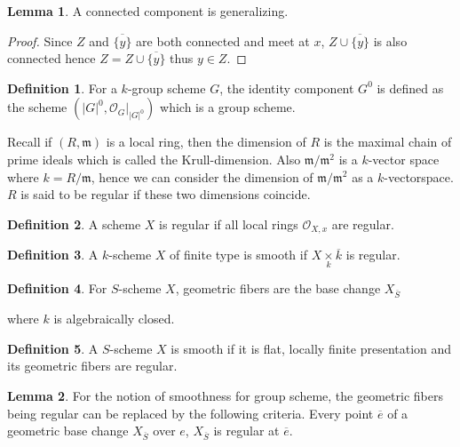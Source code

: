 \documentclass[10pt]{article}
\numberwithin{equation}{section}
\theoremstyle{definition}
\newtheorem{definition}{Definition}[section]
\newtheorem{lemma}{Lemma}[section]
\DeclareMathOperator{\Spec}{Spec}
\newcommand{\m}[0]{\mathfrak{m}}
\newcommand{\ab}[1]{\vert #1 \vert}
\newcommand{\cO}[0]{\mathcal{O}}
\newcommand{\fib}[1]{%
  \mathbin{\mathop{\times}\limits_{#1}}%
}
\begin{document}
\begin{lemma}
    \label{lemma_14}
    A connected component is generalizing.
\end{lemma}
\begin{proof}
    Since $Z$ and $\overline{\{y\}}$ are both connected and meet at $x$, $Z\cup\overline{\{y\}}$ is also connected hence $Z = Z\cup\overline{\{y\}}$ thus $y\in Z$.
\end{proof}
\begin{definition}
    \label{definition_15}
    For a $k$-group scheme $G$, the identity component $G^0$ is defined as the scheme $(\ab{G}^0,\cO_G|_{\ab{G}^0})$ which is a group scheme.
\end{definition}
Recall if $(R,\m)$ is a local ring, then the dimension of $R$ is the maximal chain of prime ideals which is called the Krull-dimension. Also $\m/\m^2$ is a $k$-vector space where $k=R/\m$, hence we can consider the dimension of $\m/\m^2$ as a $k$-vectorspace. $R$ is said to be regular if these two dimensions coincide.
\begin{definition}
    A scheme $X$ is regular if all local rings $\cO_{X,x}$ are regular.
\end{definition}
\begin{definition}
    A $k$-scheme $X$ of finite type is smooth if $X\fib{k}\overline{k}$ is regular.
\end{definition}
\begin{definition}
    For $S$-scheme $X$, geometric fibers are the base change $X_{\overline{S}}$
    \begin{center}
    \end{center}
    where $k$ is algebraically closed.
\end{definition}
\begin{definition}
    A $S$-scheme $X$ is smooth if it is flat, locally finite presentation and its geometric fibers are regular. 
\end{definition}
\begin{lemma}
    \label{lemma_16}
    For the notion of smoothness for group scheme, the geometric fibers being regular can be replaced by the following criteria. Every point $\overline{e}$ of a geometric base change $X_{\overline{S}}$ over $e$, $X_{\overline{S}}$ is regular at $\overline{e}$.
\end{lemma}
\end{document}
